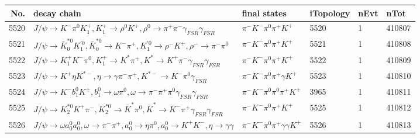\begin{table}[htbp] 
\begin{center}
\begin{small}
\begin{tabular}{rlllll}\hline\hline
 No. & decay chain & final states &  iTopology & nEvt & nTot \\\hline
5520&$J/\psi       \rightarrow K^{-}          \pi^{0}        K_1^{+}        , K_1^{+}         \rightarrow \rho^{0}      K^{+}          , \rho^{0}       \rightarrow \pi^{+}        \pi^{-}        \gamma_{FSR} \gamma_{FSR} $&$\pi^{-}        K^{-}          \pi^{0}        \pi^{+}        K^{+}          $& 5520&    1&410807\\
5521&$J/\psi       \rightarrow \bar{K}_0^{*0}K_1^{'0}      , \bar{K}_0^{*0} \rightarrow K^{-}          \pi^{+}        , K_1^{'0}       \rightarrow \rho^{-}      K^{+}          , \rho^{-}       \rightarrow \pi^{-}        \pi^{0}        $&$\pi^{-}        K^{-}          \pi^{0}        \pi^{+}        K^{+}          $& 5521&    1&410808\\
5522&$J/\psi       \rightarrow K_1^{+}        K^{-}          \pi^{0}        , K_1^{+}         \rightarrow K^{*}          \pi^{+}        , K^{*}           \rightarrow K^{+}          \pi^{-}        \gamma_{FSR} \gamma_{FSR} $&$\pi^{-}        K^{-}          \pi^{0}        \pi^{+}        K^{+}          $& 5522&    1&410809\\
5523&$J/\psi       \rightarrow K^{+}          \eta          K^{*-}         , \eta           \rightarrow \gamma       \pi^{-}        \pi^{+}        , K^{*-}          \rightarrow K^{-}          \pi^{0}        \gamma_{FSR} $&$\pi^{-}        K^{-}          \pi^{0}        \pi^{+}        \gamma       K^{+}          $& 5523&    1&410810\\
5524&$J/\psi       \rightarrow K^{-}          b_{1}^{0}      K^{+}          , b_{1}^{0}       \rightarrow \omega         \pi^{0}        , \omega          \rightarrow \pi^{-}        \pi^{+}        \pi^{0}        \gamma_{FSR} \gamma_{FSR} $&$\pi^{-}        K^{-}          \pi^{0}        \pi^{0}        \pi^{+}        K^{+}          $& 3965&    1&410811\\
5525&$J/\psi       \rightarrow K_2^{*0}       K^{+}          \pi^{-}        , K_2^{*0}        \rightarrow \bar{K}^{*}   \pi^{0}        , \bar{K}^{*}    \rightarrow K^{-}          \pi^{+}        \gamma_{FSR} \gamma_{FSR} $&$\pi^{-}        K^{-}          \pi^{0}        \pi^{+}        K^{+}          $& 5525&    1&410812\\
5526&$J/\psi       \rightarrow \omega         a_{0}^{0}      a_{0}^{0}      , \omega          \rightarrow \pi^{-}        \pi^{+}        , a_{0}^{0}       \rightarrow \eta          \pi^{0}        , a_{0}^{0}       \rightarrow K^{+}          K^{-}          , \eta           \rightarrow \gamma       \gamma       $&$\pi^{-}        K^{-}          \pi^{0}        \pi^{+}        \gamma       \gamma       K^{+}          $& 5526&    1&410813\\

\end{tabular}
\end{small}
\end{center}
\end{table}
